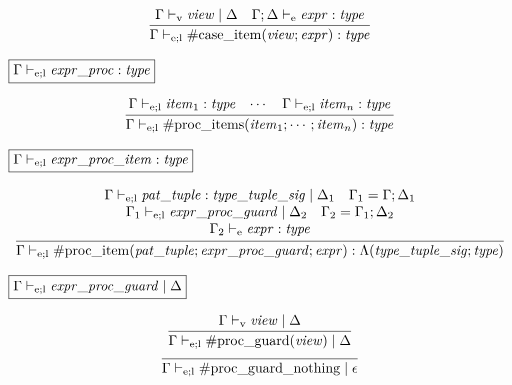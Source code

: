 \begin{gather*}
    \infer{\Gamma \vdash_{\mathrm{e}; \mathrm{l}} \mathrm{\#case\_item}(\mathit{view}; \mathit{expr}): \mathit{type}}{
        \Gamma \vdash_\mathrm{v} \mathit{view} \mid \Delta
        &
        \Gamma; \Delta \vdash_\mathrm{e} \mathit{expr}: \mathit{type}
    }
\end{gather*}

$\fbox{$\Gamma \vdash_{\mathrm{e}; \mathrm{l}} \mathit{expr\_proc}: \mathit{type}$}$

\begin{gather*}
    \infer{\Gamma \vdash_{\mathrm{e}; \mathrm{l}} \mathrm{\#proc\_items}(\mathit{item}_1; \cdots; \mathit{item}_n): \mathit{type}}{
        \Gamma \vdash_{\mathrm{e}; \mathrm{l}} \mathit{item}_1: \mathit{type}
        &
        \cdots
        &
        \Gamma \vdash_{\mathrm{e}; \mathrm{l}} \mathit{item}_n: \mathit{type}
    }
\end{gather*}

$\fbox{$\Gamma \vdash_{\mathrm{e}; \mathrm{l}} \mathit{expr\_proc\_item}: \mathit{type}$}$

\begin{gather*}
    \infer{\Gamma \vdash_{\mathrm{e}; \mathrm{l}} \mathrm{\#proc\_item}(\mathit{pat\_tuple}; \mathit{expr\_proc\_guard}; \mathit{expr}): \Lambda(\mathit{type\_tuple\_sig} ;\mathit{type})}{
        \begin{array}{c}
            \Gamma \vdash_{\mathrm{e}; \mathrm{l}} \mathit{pat\_tuple}: \mathit{type\_tuple\_sig} \mid \Delta_1
            \hspace{1em}
            \Gamma_1 = \Gamma; \Delta_1
            \\
            \Gamma_1 \vdash_{\mathrm{e}; \mathrm{l}} \mathit{expr\_proc\_guard} \mid \Delta_2
            \hspace{1em}
            \Gamma_2 = \Gamma_1; \Delta_2
            \\
            \Gamma_2 \vdash_\mathrm{e} \mathit{expr}: \mathit{type}
        \end{array}
    }
\end{gather*}

$\fbox{$\Gamma \vdash_{\mathrm{e}; \mathrm{l}} \mathit{expr\_proc\_guard} \mid \Delta$}$

\begin{gather*}
    \infer{\Gamma \vdash_{\mathrm{e}; \mathrm{l}} \mathrm{\#proc\_guard}(\mathit{view}) \mid \Delta}{
        \Gamma \vdash_\mathrm{v} \mathit{view} \mid \Delta
    }
    \\
    \infer{\Gamma \vdash_{\mathrm{e}; \mathrm{l}} \mathrm{\#proc\_guard\_nothing} \mid \epsilon}{}
\end{gather*}

